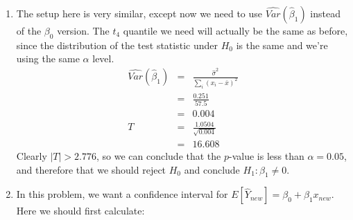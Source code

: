 {\begin{enumerate}
      Since we don't know $\sigma^2$, but only its estimate $\hat{\sigma}^2$, the best we can do is estimate this quantity. We can do that by plugging in $\hat{\sigma}^2$ for $\sigma^2$:
      \[ \hat{Var}(\hat{\beta}_0) = \hat{\sigma}^2 \left[ \frac{1}{n} + \frac{\bar{x}^2}{\sum_i (x_i - \bar{x})^2} \right] \]
      In this problem, using the data we've been given, we can evaluate this to get:
      \[ \hat{Var}(\hat{\beta}_0) = (0.251) \left[ \frac{1}{6} + \frac{5^2}{57.5} \right] = 0.151 \]
      Now under $H_0: \hat{\beta}_0 = 0$, we have:
      \[ \frac{\hat{\beta}_0 - \beta_0}{\sqrt{\hat{Var}(\hat{\beta}_0)}} = \frac{\hat{\beta}_0}{\sqrt{\hat{Var}(\hat{\beta}_0)}} \sim t_4 \]
      Using our data, we can calculate the value of the test statistic:
      \[ T = \frac{-0.169}{\sqrt{0.151}} = -0.435 \]
      Now we need the critical value that we will compare with $T$. Since the problem specified that $\alpha = 0.05$, we need the $1 - \frac{\alpha}{2} = 0.975$ quantile of the $t_4$ distribution, that is, $t_{4, 0.975}$. You can find this on the $t$-table at the intersection of the $t_{0.975}$ column and the 4 df row. The value is $2.776$. Since:
      \[ |T| < 2.776 \]
      we can conclude that the $p$-value associated to this test statistic is greater than $\alpha = 0.05$, or alternatively that we do not have enough evidence to reject the null hypothesis that $\beta_0 = 0$ in favor of the alternative.
    \item The setup here is very similar, except now we need to use $\hat{Var}(\hat{\beta}_1)$ instead of the $\beta_0$ version. The $t_4$ quantile we need will actually be the same as before, since the distribution of the test statistic under $H_0$ is the same and we're using the same $\alpha$ level.
      \begin{eqnarray*}
        \hat{Var}(\hat{\beta}_1) &=& \frac{\hat{\sigma}^2}{\sum_i (x_i - \bar{x})^2}\\
        &=& \frac{0.251}{57.5}\\
        &=& 0.004\\
        T &=& \frac{1.0504}{\sqrt{0.004}}\\
        &=& 16.608
      \end{eqnarray*}
      Clearly $|T| > 2.776$, so we can conclude that the $p$-value is less than $\alpha = 0.05$, and therefore that we should reject $H_0$ and conclude $H_1: \beta_1 \neq 0$.
    \item In this problem, we want a confidence interval for $E[\hat{Y}_{new}] = \beta_0 + \beta_1 x_{new}$. Here we should first calculate:

\end{enumerate}}
